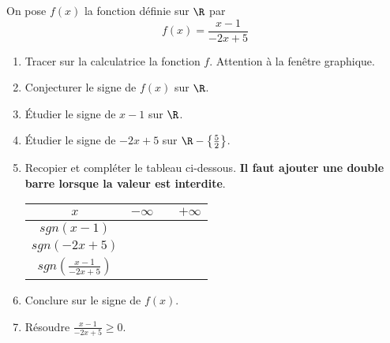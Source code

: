 
On pose $f(x)$ la fonction définie sur $\R$ par $$f(x)=\frac{x-1}{-2x+5}$$ 
\begin{enumerate}
\item Tracer sur la calculatrice la fonction $f$. Attention à la fenêtre graphique.
\item Conjecturer le signe de $f(x)$ sur $\R$.
\item Étudier le signe de $x-1$ sur $\R$.
\item Étudier le signe de $-2x+5$ sur $\R-\left\lbrace \frac{5}{2}\right\rbrace $.
\item Recopier et compléter le tableau ci-dessous. \textbf{Il faut ajouter une double barre lorsque la valeur est interdite}.

\begin{tabular}{|c|p{1cm} >{\centering\arraybackslash}p{1cm} >{\raggedleft\arraybackslash}p{1cm}|}
\hline 
$x$ & $-\infty$ & & $+\infty$ \\ 
\hline 
$sgn(x-1)$ &  &  &  \\ 
\hline 
$sgn(-2x+5)$ &  &  &  \\ 
\hline 
$sgn \left( \frac{x-1}{-2x+5} \right)$ &  &  &  \\ 
\hline 
\end{tabular} 

\item Conclure sur le signe de $f(x)$.
\item Résoudre $\frac{x-1}{-2x+5} \geq 0$.
\end{enumerate}